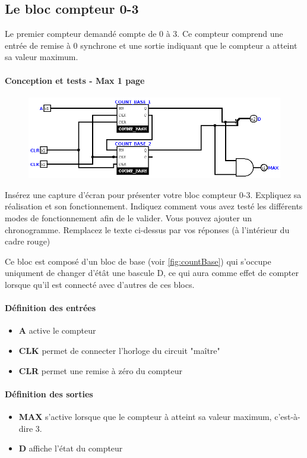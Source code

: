\documentclass[a4paper]{article} %
\begin{document}
\subsection{Le bloc compteur 0-3}
Le premier compteur demandé compte de 0 à 3. Ce compteur comprend une entrée de remise à 0 synchrone et une sortie indiquant que le compteur a atteint sa valeur maximum.
\begin{tcolorbox}[colframe=Monokaimagenta,colback=white]
\paragraph{Conception et tests - Max 1 page }
\begin{figure}[H]
\centering
    \includegraphics[width=.8\textwidth]{src/COUNT_4BITS.png}
    \label{fig:count4bits}
\end{figure}
Insérez une capture d’écran pour présenter votre bloc compteur 0-3. Expliquez sa réalisation et son fonctionnement.
Indiquez comment vous avez testé les différents modes de fonctionnement afin de le valider. Vous pouvez ajouter un chronogramme.
Remplacez le texte ci-dessus par vos réponses (à l’intérieur du cadre rouge)


Ce bloc est composé d'un bloc de base (voir \ref{fig:countBase}) qui s'occupe uniqument de changer d'étât une bascule D, ce qui aura comme effet de compter lorsque qu'il est connecté avec d'autres de ces blocs.\\
\paragraph{Définition des entrées}
\begin{itemize}

    \item     \textbf{A} active le compteur
    \item     \textbf{CLK} permet de connecter l'horloge du circuit "maître"
    \item     \textbf{CLR} permet une remise à zéro du compteur

\end{itemize}

\paragraph{Définition des sorties}
\begin{itemize}

    \item     \textbf{MAX} s'active lorsque que le compteur à atteint sa valeur maximum, c'est-à-dire 3.
    \item     \textbf{D} affiche l'état du compteur
\end{itemize}


\end{tcolorbox}
\end{document}
